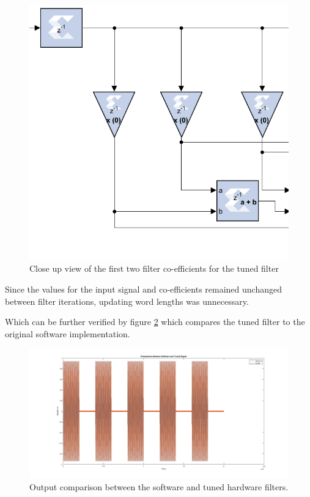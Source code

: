 \documentclass[12pt,a4paper]{article}
\begin{document}
\begin{figure}[H]
    \centering
    \includegraphics[scale=0.33]{images/tuned_block_close.PNG}
    \caption{Close up view of the first two filter co-efficients for the tuned filter}
    \label{fig:tuned_block_close}
\end{figure}

Since the values for the input signal and co-efficients remained unchanged between filter iterations, updating word lengths was unnecessary. 

Which can be further verified by figure \ref{fig:sw_tuned} which compares the tuned filter to the original software implementation.

\begin{figure}[H]
    \centering
    \includegraphics[scale=0.25]{images/sw_tuned.png}
    \caption{Output comparison between the software and tuned hardware filters.}
    \label{fig:sw_tuned}
\end{figure}
\end{document}
